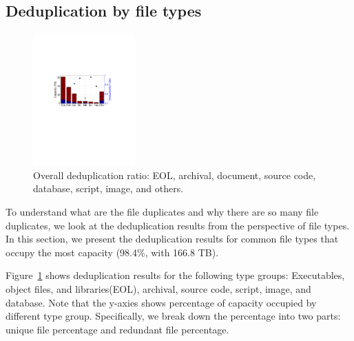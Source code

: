 
\subsection{Deduplication by file types}

\begin{figure}
	\centering
	\includegraphics[width=0.35\textwidth]{graphs/dedup-overall}
	\caption{Overall deduplication ratio: EOL, archival, document, source code, database, script, image, and others.}
	\label{fig:dedup-overall}
\end{figure}

%		

To understand what are the file duplicates and why there are so many file duplicates, we look at the deduplication results from the perspective of file types. In this section, we present the deduplication results for common file types that occupy the most capacity (98.4\%, with 166.8 TB).

Figure~\ref{fig:dedup-overall} shows deduplication results for 
the following type groups: Executables, object files, and libraries(EOL), archival, source code, script, image, and database. Note that the y-axies shows percentage of capacity occupied by different type group. Specifically, we break down the percentage into two parts: unique file percentage and redundant file percentage.

